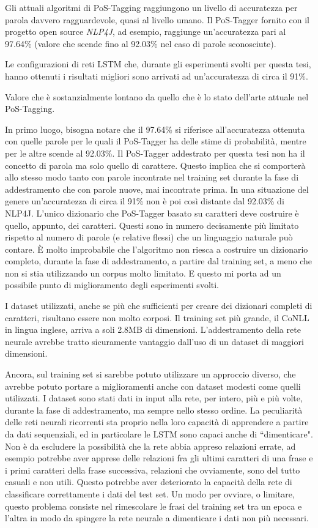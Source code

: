 Gli attuali algoritmi di PoS-Tagging raggiungono un livello di accuratezza per
parola davvero ragguardevole, quasi al livello umano. Il PoS-Tagger fornito con il
progetto open source \emph{NLP4J}, ad esempio, raggiunge un'accuratezza pari al
97.64\% (valore che scende fino al 92.03\% nel caso di parole sconosciute).

Le configurazioni di reti LSTM che, durante gli esperimenti svolti per questa
tesi, hanno ottenuti i risultati migliori sono arrivati ad un'accuratezza di circa
il 91\%.

Valore che \`e sostanzialmente lontano da quello che \`e lo stato dell'arte attuale
nel PoS-Tagging.

In primo luogo, bisogna notare che il 97.64\% si riferisce all'accuratezza
ottenuta con quelle parole per le quali il PoS-Tagger ha delle stime di
probabilit\`a, mentre per le altre scende al 92.03\%. Il PoS-Tagger addestrato
per questa tesi non ha il concetto di parola ma solo quello di carattere. Questo
implica che si comporter\`a allo stesso modo tanto con parole incontrate nel
training set durante la fase di addestramento che con parole nuove, mai incontrate
prima. In una situazione del genere un'accuratezza di circa il 91\% non \`e poi
cos\`i distante dal 92.03\% di NLP4J. L'unico dizionario che PoS-Tagger basato su
caratteri deve costruire \`e quello, appunto, dei caratteri. Questi sono in numero
decisamente pi\`u limitato rispetto al numero di parole (e relative flessi) che
un linguaggio naturale pu\`o contare. \`E molto improbabile che l'algoritmo non
riesca a costruire un dizionario completo, durante la fase di addestramento, a
partire dal training set, a meno che non si stia utilizzando un corpus molto
limitato. E questo mi porta ad un possibile punto di miglioramento degli
esperimenti svolti.

I dataset utilizzati, anche se pi\`u che sufficienti per creare dei dizionari
completi di caratteri, risultano essere non molto corposi. Il training set pi\`u
grande, il CoNLL in lingua inglese, arriva a soli 2.8MB di dimensioni. L'addestramento
della rete neurale avrebbe tratto sicuramente vantaggio dall'uso di un dataset di
maggiori dimensioni.

Ancora, sul training set si sarebbe potuto utilizzare un approccio diverso, che
avrebbe potuto portare a miglioramenti anche con dataset modesti come quelli utilizzati.
I dataset sono stati dati in input alla rete, per intero, pi\`u e pi\`u volte,
durante la fase di addestramento, ma sempre nello stesso ordine. La peculiarit\`a
delle reti neurali ricorrenti sta proprio nella loro capacit\`a di apprendere a
partire da dati sequenziali, ed in particolare le LSTM sono capaci anche di
``dimenticare". Non \`e da escludere la possibilit\`a che la rete abbia appreso
relazioni errate, ad esempio potrebbe aver apprese delle relazioni fra gli ultimi
caratteri di una frase e i primi caratteri della frase successiva, relazioni che
ovviamente, sono del tutto casuali e non utili. Questo potrebbe aver deteriorato
la capacit\`a della rete di classificare correttamente i dati del test set. Un
modo per ovviare, o limitare, questo problema consiste nel rimescolare le frasi
del training set tra un epoca e l'altra in modo da spingere la rete neurale a
dimenticare i dati non pi\`u necessari.

